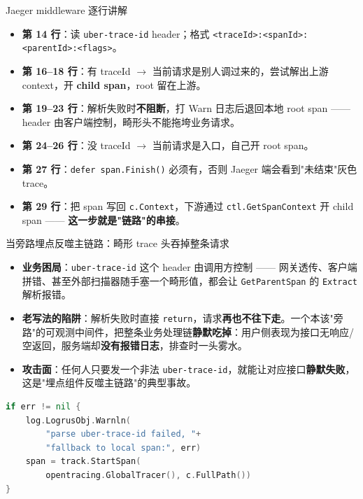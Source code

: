 \documentclass[aspectratio=169,11pt]{beamer}
\begin{document}
\begin{frame}[shrink]{Jaeger middleware 逐行讲解}
\begin{itemize}
  \item \textbf{第 14 行}：读 \texttt{uber-trace-id} header；格式 \texttt{<traceId>:<spanId>:<parentId>:<flags>}。
  \item \textbf{第 16--18 行}：有 traceId $\to$ 当前请求是别人调过来的，尝试解出上游 context，开 \textbf{child span}，root 留在上游。
  \item \textbf{第 19--23 行}：解析失败时\textbf{不阻断}，打 Warn 日志后退回本地 root span —— header 由客户端控制，畸形头不能拖垮业务请求。
  \item \textbf{第 24--26 行}：没 traceId $\to$ 当前请求是入口，自己开 root span。
  \item \textbf{第 27 行}：\texttt{defer span.Finish()} 必须有，否则 Jaeger 端会看到"未结束"灰色 trace。
  \item \textbf{第 29 行}：把 span 写回 \texttt{c.Context}，下游通过 \texttt{ctl.GetSpanContext} 开 child span —— \textbf{这一步就是"链路"的串接}。
\end{itemize}
\end{frame}

\begin{frame}{当旁路埋点反噬主链路：畸形 trace 头吞掉整条请求}
\begin{itemize}
  \item \textbf{业务困局}：\texttt{uber-trace-id} 这个 header 由调用方控制 —— 网关透传、客户端拼错、甚至外部扫描器随手塞一个畸形值，都会让 \texttt{GetParentSpan} 的 \texttt{Extract} 解析报错。
  \item \textbf{老写法的陷阱}：解析失败时直接 \texttt{return}，请求\textbf{再也不往下走}。一个本该"旁路"的可观测中间件，把整条业务处理链\textbf{静默吃掉}：用户侧表现为接口无响应/空返回，服务端却\textbf{没有报错日志}，排查时一头雾水。
  \item \textbf{攻击面}：任何人只要发一个非法 \texttt{uber-trace-id}，就能让对应接口\textbf{静默失败}，这是"埋点组件反噬主链路"的典型事故。
\end{itemize}
\begin{lstlisting}[language=Go,firstnumber=19,
  caption={修后（fail-open 降级放行）}]
if err != nil {
    log.LogrusObj.Warnln(
        "parse uber-trace-id failed, "+
        "fallback to local span:", err)
    span = track.StartSpan(
        opentracing.GlobalTracer(), c.FullPath())
}
\end{lstlisting}
\end{frame}
\end{document}
